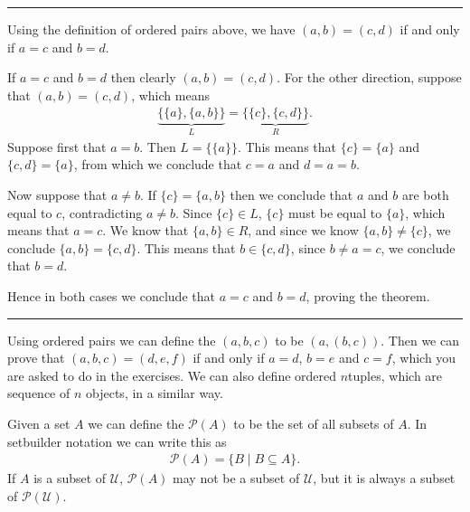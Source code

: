 \documentclass[letterpaper,10pt,english]{sphinxmanual}
\begin{document}
\bigskip\hrule\bigskip


\sphinxAtStartPar
{} Using the definition of ordered pairs above, we have \((a, b) = (c, d)\) if and only if \(a = c\) and \(b = d\).

\sphinxAtStartPar
{} If \(a = c\) and \(b = d\) then clearly \((a, b) = (c, d)\). For the other direction, suppose that \((a, b) = (c, d)\), which means
\begin{equation*}
\begin{split}\underbrace{\{\{a\}, \{a, b\}\}}_L = \underbrace{\{\{c\}, \{c, d\}\}}_R.\end{split}
\end{equation*}
\sphinxAtStartPar
Suppose first that \(a = b\). Then \(L = \{\{a\}\}\). This means that \(\{c\} = \{a\}\) and \(\{c, d\} = \{a\}\), from which we conclude that \(c = a\) and \(d = a = b\).

\sphinxAtStartPar
Now suppose that \(a \neq b\). If \(\{c\} = \{a, b\}\) then we conclude that \(a\) and \(b\) are both equal to \(c\), contradicting \(a \neq b\). Since \(\{c\}\in L\), \(\{c\}\) must be equal to \(\{a\}\), which means that \(a = c\). We know that \(\{a, b\} \in R\), and since we know \(\{a, b\}\neq \{c\}\), we conclude \(\{a, b\} = \{c, d\}\). This means that \(b \in\{c, d\}\), since \(b \neq a = c\), we conclude that \(b = d\).

\sphinxAtStartPar
Hence in both cases we conclude that \(a = c\) and \(b = d\), proving the theorem.


\bigskip\hrule\bigskip


\sphinxAtStartPar
Using ordered pairs we can define the  \((a, b, c)\) to be \((a, (b, c))\). Then we can prove that \((a, b, c) = (d, e, f)\) if and only if \(a = d\), \(b = e\) and \(c = f\), which you are asked to do in the exercises. We can also define ordered \(n\)\sphinxhyphen{}tuples, which are sequence of \(n\) objects, in a similar way.

\sphinxAtStartPar
Given a set \(A\) we can define the  \(\mathcal P(A)\) to be the set of all subsets of \(A\). In set\sphinxhyphen{}builder notation we can write this as
\begin{equation*}
\begin{split}\mathcal P(A) = \{B \mid B \subseteq A\}.\end{split}
\end{equation*}
\sphinxAtStartPar
If \(A\) is a subset of \(\mathcal U\), \(\mathcal P(A)\) may not be a subset of \(\mathcal U\), but it is always a subset of \(\mathcal P(\mathcal U)\).
\end{document}
